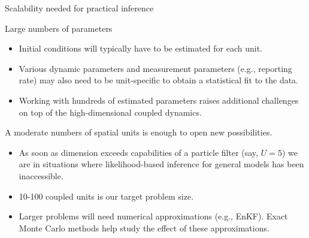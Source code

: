 \documentclass{beamer}
\begin{document}
\begin{frame}{Scalability needed for practical inference}

Large numbers of parameters
  \begin{itemize}
  \item  Initial conditions will typically have to be estimated for each unit.
  \item Various dynamic parameters and measurement parameters (e.g., reporting rate) may also need to be unit-specific to obtain a statistical fit to the data.
\item Working with hundreds of estimated parameters raises additional challenges on top of the high-dimensional coupled dynamics.
  \end{itemize}

\vspace{5mm}
  
A moderate numbers of spatial units is enough to open new possibilities.

  \begin{itemize}
  \item As soon as dimension exceeds capabilities of a particle filter (say, $U=5$) we are in situations where likelihood-based inference for general models has been inaccessible.

  \item 10-100 coupled units is our target problem size.

  \item Larger problems will need numerical approximations (e.g., EnKF). Exact Monte Carlo methods help study the effect of these approximations.
    
  \end{itemize}

  \end{frame}
 
\end{document}
